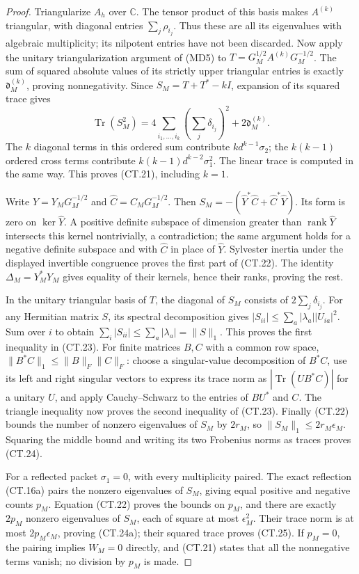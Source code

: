 \begin{proof}
Triangularize \(A_h\) over \(\mathbb C\).  The tensor product
of this basis makes \(A^{(k)}\) triangular, with diagonal entries
\(\sum_j\rho_{i_j}\).  Thus these are all its eigenvalues
with algebraic multiplicity; its nilpotent entries have not been
discarded.  Now apply the unitary triangularization argument of
(MD5) to \(T=G_M^{1/2}A^{(k)}G_M^{-1/2}\).  The sum of
squared absolute values of its strictly upper triangular entries is
exactly \(\mathfrak d_M^{(k)}\), proving nonnegativity.
Since \(S_M=T+T^*-kI\), expansion of its squared trace gives
\[
 \operatorname{Tr}(S_M^2)=
    4\sum_{i_1,\ldots,i_k}(\sum_j\delta_{i_j})^2
                      +2\mathfrak d_M^{(k)}.
\]
The \(k\) diagonal terms in this ordered sum contribute
\(kd^{k-1}\sigma_2\); the \(k(k-1)\) ordered cross terms
contribute \(k(k-1)d^{k-2}\sigma_1^2\).  The linear trace is
computed in the same way.  This proves (CT.21), including \(k=1\).

Write \(\widehat Y=Y_MG_M^{-1/2}\) and
\(\widehat C=C_MG_M^{-1/2}\).  Then
\(S_M=-(\widehat Y^*\widehat C+
\widehat C^*\widehat Y)\).  Its form is zero on
\(\ker\widehat Y\).  A positive definite subspace of dimension
greater than \(\operatorname{rank}\widehat Y\) intersects this
kernel nontrivially, a contradiction; the same argument holds for
a negative definite subspace and with \(\widehat C\) in place
of \(\widehat Y\).  Sylvester inertia under the displayed
invertible congruence proves the first part of (CT.22).
The identity \(\Delta_M=Y_M^*Y_M\) gives equality of their
kernels, hence their ranks, proving the rest.

In the unitary triangular basis of \(T\), the diagonal of
\(S_M\) consists of \(2\sum_j\delta_{i_j}\).
For any Hermitian matrix \(S\), its spectral decomposition gives
\(|S_{ii}|\le\sum_a|\lambda_a||U_{ia}|^2\).  Sum over \(i\)
to obtain \(\sum_i|S_{ii}|\le\sum_a|\lambda_a|=\|S\|_1\).
This proves the first inequality in (CT.23).
For finite matrices \(B,C\) with a common row space,
\(\|B^*C\|_1\le\|B\|_F\|C\|_F\): choose a singular-value
decomposition of \(B^*C\), use its left and right singular
vectors to express its trace norm as
\(|\operatorname{Tr}(U B^*C)|\) for a unitary \(U\), and
apply Cauchy--Schwarz to the entries of \(BU^*\) and \(C\).
The triangle inequality now proves the second inequality of
(CT.23).  Finally (CT.22) bounds the number of nonzero eigenvalues
of \(S_M\) by \(2r_M\), so
\(\|S_M\|_1\le2r_M\epsilon_M\).  Squaring the middle
bound and writing its two Frobenius norms as traces proves (CT.24).

For a reflected packet \(\sigma_1=0\), with every multiplicity
paired.  The exact reflection (CT.16a) pairs the nonzero eigenvalues
of \(S_M\), giving equal positive and negative counts \(p_M\).
Equation (CT.22) proves the bounds on \(p_M\), and there are
exactly \(2p_M\) nonzero eigenvalues of \(S_M\), each of square
at most \(\epsilon_M^2\).  Their trace norm is at most
\(2p_M\epsilon_M\), proving (CT.24a); their squared trace
proves (CT.25).  If \(p_M=0\), the pairing implies
\(W_M=0\) directly, and (CT.21) states that all the
nonnegative terms vanish; no division by \(p_M\) is made.
\end{proof}

